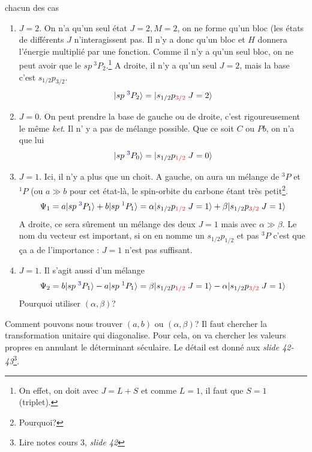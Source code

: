 chacun des cas
\begin{enumerate}
\item $J=2$. On n'a qu'un seul état $J=2, M=2$, on ne forme qu'un bloc (les états de différents $J$ 
n'interagissent pas. Il n'y a donc qu'un bloc et $H$ donnera l'énergie multiplié par une fonction. 
Comme il n'y a qu'un seul bloc, on ne peut avoir que le $sp\ ^3P_2$.\footnote{On effet, on doit 
avec $J=L+S$ et comme $L=1$, il faut que $S=1$ (triplet).} A droite, il n'y a qu'un
seul $J=2$, mais la base c'est $s_{1/2}p_{3/2}$.
\begin{equation}
  \vert sp \; ^{{\color{blue} 3}}P_2 \rangle  
=
\vert s_{1/2} p_{{\color{red} 3/2}} \; J=2  \rangle
\end{equation}
\item $J=0$. On peut prendre la base de gauche ou de droite, c'est rigoureusement le même 
\textit{ket}. Il n' y a pas de mélange possible. Que ce soit $C$ ou $Pb$, on n'a que lui
\begin{equation}
  \vert sp \; ^{{\color{blue} 3}}P_0 \rangle  
=
\vert s_{1/2} p_{{\color{red} 1/2}} \; J=0  \rangle
\end{equation}
\item $J=1$. Ici, il n'y a plus que un choit. A gauche, on aura un mélange de $^3P$ et 
$^1P$ (ou $a \gg b$ pour cet état-là, le spin-orbite du carbone étant très petit\footnote{Pourquoi?}.
\begin{equation}
\Psi_1 = a 
  \vert sp \; ^{{\color{blue} 3}}P_1 \rangle
+ b
  \vert sp \; ^{{\color{blue} 1}}P_1 \rangle
=
\alpha
  \vert s_{1/2} p_{{\color{red} 1/2}} \; J=1  \rangle
+ \beta
  \vert s_{1/2} p_{{\color{red} 3/2}} \; J=1  \rangle
\end{equation}
A droite, ce sera sûrement un mélange des deux $J=1$ mais avec $\alpha\gg \beta$. Le nom du 
vecteur est important, si on en nomme un $s_{1/2}p_{1/2}$ et pas $^3P$ c'est que ça a de 
l'importance : $J=1$ n'est pas suffisant.
\item $J=1$. Il s'agit aussi d'un mélange
\begin{equation}
\Psi_2 = b 
  \vert sp \; ^{{\color{blue} 3}}P_1 \rangle
-a
  \vert sp \; ^{{\color{blue} 1}}P_1 \rangle
=
\beta
  \vert s_{1/2} p_{{\color{red} 1/2}} \; J=1  \rangle
- \alpha
  \vert s_{1/2} p_{{\color{red} 3/2}} \; J=1  \rangle
\end{equation}
Pourquoi utiliser $(\alpha,\beta)$?
\end{enumerate}
Comment pouvons nous trouver $(a,b)$ ou $(\alpha,\beta)$? Il faut chercher la transformation
unitaire qui diagonalise. Pour cela, on va chercher les valeurs propres en annulant le 
déterminant séculaire. Le détail est donné aux \textit{slide 42-43}\footnote{Lire notes 
cours 3, \textit{slide 42}}.

